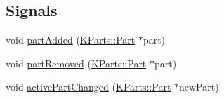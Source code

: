 \subsection*{Signals}
\begin{DoxyCompactItemize}
\item 
void \hyperlink{classKParts_1_1PartManager_a0ddd1f334b7c397dcb2b11b418604a3f}{part\+Added} (\hyperlink{classKParts_1_1Part}{K\+Parts\+::\+Part} $\ast$part)
\item 
void \hyperlink{classKParts_1_1PartManager_afacc58788662a9e2eb73cc9418d442d8}{part\+Removed} (\hyperlink{classKParts_1_1Part}{K\+Parts\+::\+Part} $\ast$part)
\item 
void \hyperlink{classKParts_1_1PartManager_a9142dcbea26a78a91d4075a223594e3d}{active\+Part\+Changed} (\hyperlink{classKParts_1_1Part}{K\+Parts\+::\+Part} $\ast$new\+Part)
\end{DoxyCompactItemize}
